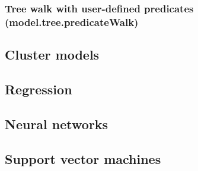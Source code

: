\documentclass{article}
\theoremstyle{definition}
\begin{document}
\subsubsection{Tree walk with user-defined predicates (model.tree.predicateWalk)}

\subsection{Cluster models}

\subsection{Regression}

\subsection{Neural networks}

\subsection{Support vector machines}
\end{document}
